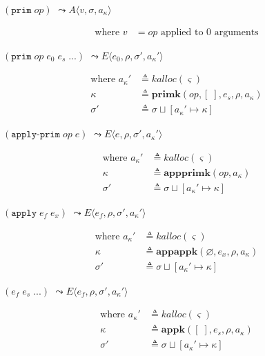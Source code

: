 \documentclass[12pt,draft]{article}
\newcommand{\primsyn}[2]{(\texttt{prim}\;#1\;#2\;...)}
\newcommand{\singleprimsyn}[1]{(\texttt{prim}\;#1)}
\newcommand{\applyprimsyn}[2]{(\texttt{apply-prim}\;#1\;#2)}
\newcommand{\applysyn}[2]{(\texttt{apply}\;#1\;#2)}
\newcommand{\env}[0]{\rho}
\newcommand{\store}[0]{\sigma}
\newcommand{\kaddr}[0]{a_{\kappa}}
\newcommand{\kont}[0]{\kappa}
\newcommand{\state}[0]{\varsigma}
\newcommand{\E}[4]{E\langle #1 , #2 , #3 , #4 \rangle}
\newcommand{\A}[3]{A\langle #1 , #2 , #3 \rangle}
\begin{document}
{\begin{multicols*}{2}
\begin{center}
  $\singleprimsyn{op}$
  $\leadsto \A{v}{\store}{\kaddr}$
\end{center}
\vspace{-7mm}
\begin{align*}
\text{where } v &= op \text{ applied to } 0 \text{ arguments}
\end{align*}
\begin{center}
  $\primsyn{op}{e_0\;e_s}$
  $\leadsto \E{e_0}{\env}{\store'}{\kaddr'}$
\end{center}
\vspace{-7mm}
\begin{align*}
  \text{where }
  \kaddr' &\triangleq kalloc(\state) \\
  \kont &\triangleq \textbf{primk}(op , [\;], e_s , \env , \kaddr) \\
  \store' &\triangleq \store \sqcup [\kaddr' \mapsto \kont]
\end{align*}
\begin{center}
  $\applyprimsyn{op}{e}$
  $\leadsto \E{e}{\env}{\store'}{\kaddr'}$
\end{center}
\vspace{-7mm}
\begin{align*}
  \text{where }
  \kaddr' &\triangleq kalloc(\state) \\
  \kont &\triangleq \textbf{appprimk}(op, \kaddr) \\
  \store' &\triangleq \store \sqcup [\kaddr' \mapsto \kont]
\end{align*}
\begin{center}
  $\applysyn{e_f}{e_x}$
  $\leadsto \E{e_f}{\env}{\store'}{\kaddr'}$
\end{center}
\vspace{-7mm}
\begin{align*}
  \text{where }
  \kaddr' &\triangleq kalloc(\state) \\
  \kont &\triangleq \textbf{appappk}(\varnothing, e_x, \env, \kaddr) \\
  \store' &\triangleq \store \sqcup [\kaddr' \mapsto \kont]
\end{align*}
\begin{center}
  $(e_f\;e_s\;...)$
  $\leadsto \E{e_f}{\env}{\store'}{\kaddr'}$
\end{center}
\vspace{-5mm}
\begin{align*}
  \text{where }
  \kaddr' &\triangleq kalloc(\state) \\
  \kont &\triangleq \textbf{appk}([\;] , e_s , \env , \kaddr) \\
  \store' &\triangleq \store \sqcup [\kaddr' \mapsto \kont]
\end{align*}
\end{multicols*}
} %
\end{document}
